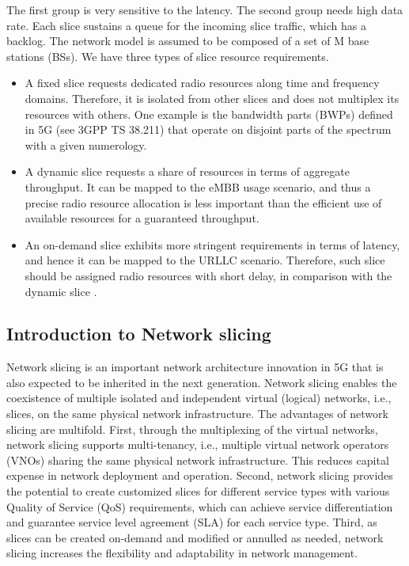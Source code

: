 \documentclass[conference]{IEEEtran}
\begin{document}
The first group is very sensitive to the latency. The second group needs high data rate.
Each slice sustains a queue
for the incoming slice traffic, which has a backlog.
The network model is assumed to be composed of a set of M
base stations (BSs).
We have three types of slice resource requirements.
\begin{itemize}
\item A fixed slice requests dedicated radio resources along
time and frequency domains. Therefore, it is isolated
from other slices and does not multiplex its resources
with others. One example is the bandwidth parts (BWPs)
defined in 5G (see 3GPP TS 38.211) that operate on
disjoint parts of the spectrum with a given numerology.
\item A dynamic slice requests a share of resources in terms
of aggregate throughput. It can be mapped to the eMBB
usage scenario, and thus a precise radio resource allocation is less important than the efficient use of available
resources for a guaranteed throughput.
\item An on-demand slice exhibits more stringent requirements
in terms of latency, and hence it can be mapped to
the URLLC scenario. Therefore, such slice should be
assigned radio resources with short delay, in comparison
with the dynamic slice \cite{schmidt2019slice}.
\end{itemize}




\subsection{Introduction to Network slicing}
Network slicing is an important network architecture innovation in 5G that is also expected to be inherited in the next generation. Network slicing enables the coexistence of
multiple isolated and independent virtual (logical) networks,
i.e., slices, on the same physical network infrastructure. The
advantages of network slicing are multifold. First, through the
multiplexing of the virtual networks, network slicing supports
multi-tenancy, i.e., multiple virtual network operators (VNOs)
sharing the same physical network infrastructure. This
reduces capital expense in network deployment and operation. Second, network slicing provides the potential to create customized slices for different service types with various
Quality of Service (QoS) requirements, which can achieve service differentiation
and guarantee service level agreement (SLA) for each service
type. Third, as slices can be created on-demand and modified
or annulled as needed, network slicing increases the flexibility
and adaptability in network management.
\end{document}
